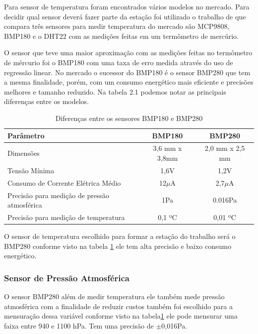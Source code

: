 Para sensor de temperatura foram encontrados vários modelos no mercado. Para decidir qual sensor deverá fazer parte da estação foi utilizado o trabalho de \cite{konstantinoscomparative} que compara três sensores para medir temperatura do mercado são MCP9808, BMP180 e o DHT22 com as medições feitas em um termômetro de mercúrio.

O sensor que teve uma maior aproximação com as medições feitas no termômetro de mércurio foi o BMP180 com uma taxa de erro medida através do uso de regressão linear. No mercado o sucessor do BMP180 é o sensor BMP280 que tem a mesma finalidade, porém, com um consumo energético mais eficiente e precisões melhores e tamanho reduzido. Na tabela 2.1 podemos notar as principais diferenças entre os modelos.

\begin{table}[!h]
\centering
\begin{tabular}{|l|c|c|}
\hline
\textbf{Parâmetro}                           & \textbf{BMP180} & \textbf{BMP280} \\ \hline
Dimensões                                    & 3,6 mm x 3,8mm  & 2,0 mm x 2,5 mm \\ \hline
Tensão Mínima                                & 1,6V            & 1,2V            \\ \hline
Consumo de Corrente Elétrica Médio           & 12$\mu$A         & 2,7$\mu$A        \\ \hline
Precisão para medição de pressão atmosférica & 1Pa             & 0.016Pa         \\ \hline
Precisão para medição de temperatura         & 0,1 ºC          & 0,01 ºC         \\ \hline
\end{tabular}
\caption{Diferenças entre os sensores BMP180 e BMP280}
\label{tab:tablebmp}
\end{table}

O sensor de temperatura escolhido para formar a estação do trabalho será o BMP280 conforme visto na tabela \ref{tab:tablebmp} ele tem alta precisão e baixo consumo energético.

\subsubsection{Sensor de Pressão Atmosférica}

O sensor BMP280 além de medir temperatura ele também mede pressão atmosférica com a finalidade de reduzir custos também foi escolhido para a mensuração dessa variável conforme visto na tabela\ref{tab:tablebmp} ele pode mensurar uma faixa entre 940 e 1100 hPa. Tem uma precisão de $\pm$0,016Pa.

